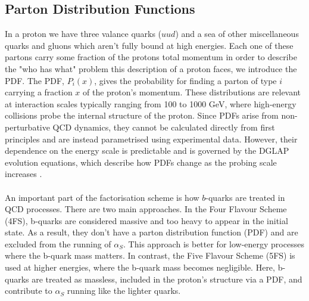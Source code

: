 \subsection{Parton Distribution Functions}
In a proton we have three valance quarks ($uud$) and a sea of other miscellaneous quarks and gluons which aren't fully bound at high energies. Each one of these partons carry some fraction of the protons total momentum in order to describe the "who has what" problem this description of a proton faces, we introduce the PDF. The PDF, $P_i(x)$, gives the probability for finding a parton of type $i$ carrying a fraction $x$ of the proton's momentum. These distributions are relevant at interaction scales typically ranging from 100 to 1000 GeV, where high-energy collisions probe the internal structure of the proton. Since PDFs arise from non-perturbative QCD dynamics, they cannot be calculated directly from first principles and are instead parametrised using experimental data. However, their dependence on the energy scale is predictable and is governed by the DGLAP evolution equations, which describe how PDFs change as the probing scale increases \cite{DGLAP1,DGLAP2,DGLAP3}.
\\
\\
An important part of the factorisation scheme is how $b$-quarks are treated in QCD processes. There are two main approaches. In the Four Flavour Scheme (4FS), b-quarks are considered massive and too heavy to appear in the initial state. As a result, they don't have a parton distribution function (PDF) and are excluded from the running of $\alpha_S$. This approach is better for low-energy processes where the b-quark mass matters. In contrast, the Five Flavour Scheme (5FS) is used at higher energies, where the b-quark mass becomes negligible. Here, b-quarks are treated as massless, included in the proton’s structure via a PDF, and contribute to $\alpha_S$ running like the lighter quarks.

